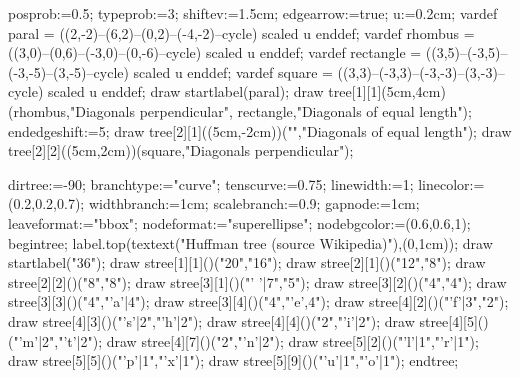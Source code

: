 \documentclass[11pt,a4paper,english]{article}
\begin{document}
\begin{exemple}
posprob:=0.5;
typeprob:=3;
shiftev:=1.5cm;
edgearrow:=true;
u:=0.2cm;
vardef paral = ((2,-2)--(6,2)--(0,2)--(-4,-2)--cycle) scaled u enddef;
vardef rhombus = ((3,0)--(0,6)--(-3,0)--(0,-6)--cycle) scaled u enddef;
vardef rectangle = ((3,5)--(-3,5)--(-3,-5)--(3,-5)--cycle) scaled u enddef;
vardef square = ((3,3)--(-3,3)--(-3,-3)--(3,-3)--cycle) scaled u enddef;
draw startlabel(paral);
draw tree[1][1](5cm,4cm)(rhombus,"Diagonals perpendicular",%
                            rectangle,"Diagonals of equal length");
endedgeshift:=5;
draw tree[2][1]((5cm,-2cm))("","Diagonals of equal length");
draw tree[2][2]((5cm,2cm))(square,"Diagonals perpendicular");
\end{exemple}

\begin{exemple}
dirtree:=-90;
branchtype:="curve";  tenscurve:=0.75;
linewidth:=1;         linecolor:=(0.2,0.2,0.7);
widthbranch:=1cm;     scalebranch:=0.9;
gapnode:=1cm;
leaveformat:="bbox";
nodeformat:="superellipse"; nodebgcolor:=(0.6,0.6,1);
begintree;
label.top(textext("\Large Huffman tree (source Wikipedia)"),(0,1cm));
draw startlabel("36");
draw stree[1][1]()("20","16");
draw stree[2][1]()("12","8");
draw stree[2][2]()("8","8");
draw stree[3][1]()("' '|7","5");
draw stree[3][2]()("4","4");
draw stree[3][3]()("4","'a'|4");
draw stree[3][4]()("4","'e',4");
draw stree[4][2]()("'f'|3","2");
draw stree[4][3]()("'s'|2","'h'|2");
draw stree[4][4]()("2","'i'|2");
draw stree[4][5]()("'m'|2","'t'|2");
draw stree[4][7]()("2","'n'|2");
draw stree[5][2]()("'l'|1","'r'|1");
draw stree[5][5]()("'p'|1","'x'|1");
draw stree[5][9]()("'u'|1","'o'|1");
endtree;
\end{exemple}
\end{document}
